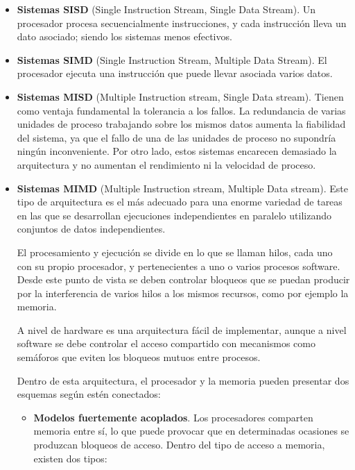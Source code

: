 \documentclass[a4paper, 11pt, titlepage]{article}
\begin{document}
        \begin{itemize}
            \item \textbf{Sistemas SISD} (Single  Instruction  Stream,  Single  Data  Stream). Un 
            procesador procesa secuencialmente instrucciones, y cada instrucción lleva un dato asociado; 
            siendo los sistemas menos efectivos.
            \item \textbf{Sistemas SIMD} (Single  Instruction  Stream,  Multiple  Data  Stream). 
            El procesador ejecuta una instrucción que puede llevar asociada varios datos.
            \item \textbf{Sistemas MISD} (Multiple  Instruction  stream,  Single  Data  stream). Tienen  
            como ventaja fundamental la tolerancia a los fallos. La redundancia de varias unidades de
            proceso trabajando sobre los mismos datos aumenta la fiabilidad del sistema, ya que el fallo 
            de una de las unidades de proceso no supondría ningún inconveniente. Por otro lado, estos 
            sistemas encarecen demasiado la arquitectura y no aumentan el rendimiento ni la velocidad de 
            proceso. 
            \item \textbf{Sistemas MIMD} (Multiple Instruction stream, Multiple Data stream). Este tipo 
            de arquitectura es el más adecuado para una enorme variedad de tareas en las que se desarrollan 
            ejecuciones independientes en paralelo utilizando conjuntos de datos independientes. 

            El procesamiento y ejecución se divide en lo que se llaman hilos, cada uno con su propio 
            procesador, y pertenecientes a uno o varios procesos software. Desde este punto de vista se
            deben controlar bloqueos que se puedan producir por la interferencia de varios hilos a los 
            mismos recursos, como por ejemplo la memoria.

            A nivel de hardware es una arquitectura fácil de implementar, aunque a nivel software se debe
            controlar el acceso compartido con mecanismos como semáforos que eviten los bloqueos mutuos 
            entre procesos. 

            Dentro de esta arquitectura, el procesador y la memoria pueden presentar dos esquemas según 
            estén conectados:
            
            \begin{itemize}
                \item \textbf{Modelos  fuertemente  acoplados}. Los procesadores comparten memoria entre sí,
                lo que puede provocar que en determinadas ocasiones se produzcan bloqueos de acceso.
                Dentro del tipo de acceso a memoria, existen dos tipos:
                

\end{itemize}
\end{itemize}
\end{document}
